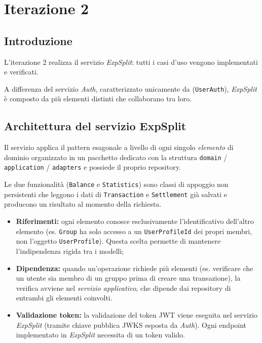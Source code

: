 \section{Iterazione 2}

\subsection{Introduzione}
L'iterazione 2 realizza il servizio \emph{ExpSplit}: tutti i casi d'uso vengono implementati e verificati.

A differenza del servizio \emph{Auth}, caratterizzato unicamente da (\texttt{UserAuth}), \emph{ExpSplit} è composto da più elementi distinti che collaborano tra loro.

\subsection{Architettura del servizio ExpSplit}
Il servizio applica il pattern esagonale a livello di ogni singolo \emph{elemento} di dominio organizzato in un pacchetto dedicato con la struttura \texttt{domain} / \texttt{application} / \texttt{adapters} e possiede il proprio repository. 

Le due funzionalità (\texttt{Balance} e \texttt{Statistics}) sono classi di appoggio non persistenti che leggono i dati di \texttt{Transaction} e \texttt{Settlement} già salvati e producono un risultato al momento della richiesta.

\begin{itemize}
    \item \textbf{Riferimenti:} ogni elemento conosce esclusivamente l'identificativo dell'altro elemento (es. \texttt{Group} ha solo accesso a un \texttt{UserProfileId} dei propri membri, non l'oggetto \texttt{UserProfile}). Questa scelta permette di mantenere l'indipendenza rigida tra i modelli;
    \item \textbf{Dipendenza:} quando un'operazione richiede più elementi (es. verificare che un utente sia membro di un gruppo prima di creare una transazione), la verifica avviene nel \emph{servizio applicativo}, che dipende dai repository di entrambi gli elementi coinvolti.
    \item \textbf{Validazione token:} la validazione del token JWT viene eseguita nel servizio \emph{ExpSplit} (tramite chiave pubblica JWKS esposta da \emph{Auth}). Ogni endpoint implementato in \emph{ExpSplit} necessita di un token valido.
\end{itemize}

